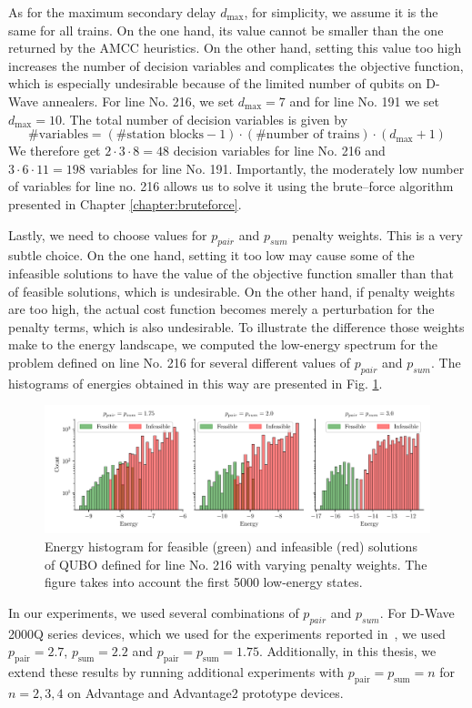 As for the maximum secondary delay $d_{\max}$, for simplicity, we assume it is
the same for all trains. On the one hand, its value cannot be smaller than the
one returned by the AMCC heuristics. On the other hand, setting this value too
high increases the number of decision variables and complicates the objective
function, which is especially undesirable because of the limited number of
qubits on D-Wave annealers. For line No. 216, we set $d_{\max}=7$ and for line
No. 191 we set $d_{\max}=10$. The total number of decision variables is given
by
\begin{equation}
  \mbox{\#variables} = (\mbox{\#station blocks}-1) \cdot (\mbox{\#number of trains}) \cdot (d_{\max}+1)
\end{equation}
We therefore get $2\cdot 3 \cdot 8 = 48$ decision variables for line No. 216
and $3 \cdot 6 \cdot 11 = 198$ variables for line No. 191. Importantly, the
moderately low number of variables for line no. 216 allows us to solve it using
the brute--force algorithm presented in Chapter \ref{chapter:bruteforce}.

Lastly, we need to choose values for $p_{pair}$ and $p_{sum}$ penalty weights.
This is a very subtle choice. On the one hand, setting it too low may cause
some of the infeasible solutions to have the value of the objective function
smaller than that of feasible solutions, which is undesirable. On the other
hand, if penalty weights are too high, the actual cost function becomes merely
a perturbation for the penalty terms, which is also undesirable. To illustrate
the difference those weights make to the energy landscape, we computed the
low-energy spectrum for the problem defined on line No. 216 for several
different values of $p_{pair}$ and $p_{sum}$. The histograms of energies
obtained in this way are presented in Fig. \ref{fig:penaltyhistogram}.

\begin{figure}
  \includegraphics[width=\textwidth]{figures/railway_histograms_bf}
  \caption{Energy histogram for feasible (green) and infeasible (red) solutions of QUBO
    defined for line No. 216 with varying penalty weights. The figure takes into
    account the first 5000 low-energy states.} \label{fig:penaltyhistogram}
\end{figure}
In our experiments, we used several combinations of $p_{pair}$ and $p_{sum}$.
For D-Wave 2000Q series devices, which we used for the experiments reported
in~\cite{railwaydispatching}, we used $p_{\text{pair}}=2.7$,
$p_{\text{sum}}=2.2$ and $p_{\text{pair}} = p_{\text{sum}} = 1.75$.
Additionally, in this thesis, we extend these results by running additional
experiments with $p_{\text{pair}}=p_{\text{sum}}=n$ for $n=2, 3, 4$ on
Advantage and Advantage2 prototype devices.

